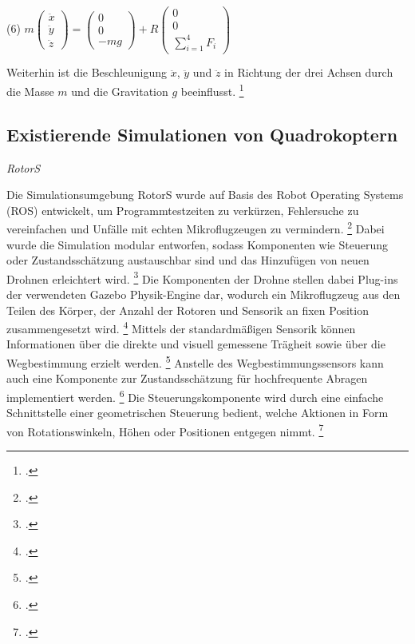 \begin{description}
    \item \begin{center} (6) $m\begin{pmatrix} \ddot x \\ \ddot y \\ \ddot z \end{pmatrix} = \begin{pmatrix}0 \\ 0 \\ -mg\end{pmatrix} + R\begin{pmatrix} 0 \\ 0 \\ \sum_{i=1}^{4} F_{i} \end{pmatrix}$ \end{center}
\end{description}
Weiterhin ist die Beschleunigung $\ddot x$, $\ddot y$ und $\ddot z$ in Richtung der drei Achsen durch die Masse $m$ und die Gravitation $g$ beeinflusst. \footcite[Vgl.][S. 3]{Deshpande.2020}


\subsection{Existierende Simulationen von Quadrokoptern}

\textit{RotorS}

Die Simulationsumgebung RotorS wurde auf Basis des Robot Operating Systems (ROS) entwickelt, um Programmtestzeiten zu verkürzen, Fehlersuche zu vereinfachen und Unfälle mit echten Mikroflugzeugen zu vermindern. \footcite[Vgl.][S. 596]{Furrer.2016}
Dabei wurde die Simulation modular entworfen, sodass Komponenten wie Steuerung oder Zustandsschätzung austauschbar sind und das Hinzufügen von neuen Drohnen erleichtert wird. \footcite[Vgl.][S. 595]{Furrer.2016}
Die Komponenten der Drohne stellen dabei Plug-ins der verwendeten Gazebo Physik-Engine dar, wodurch ein Mikroflugzeug aus den Teilen des Körper, der Anzahl der Rotoren und Sensorik an fixen Position zusammengesetzt wird. \footcite[Vgl.][S. 597]{Furrer.2016}
Mittels der standardmäßigen Sensorik können Informationen über die direkte und visuell gemessene Trägheit sowie über die Wegbestimmung erzielt werden. \footcite[Vgl.][S. 597]{Furrer.2016}
Anstelle des Wegbestimmungssensors kann auch eine Komponente zur Zustandsschätzung für hochfrequente Abragen implementiert werden. \footcite[Vgl.][S. 598]{Furrer.2016}
Die Steuerungskomponente wird durch eine einfache Schnittstelle einer geometrischen Steuerung bedient, welche Aktionen in Form von Rotationswinkeln, Höhen oder Positionen entgegen nimmt. \footcite[Vgl.][S. 598]{Furrer.2016}

